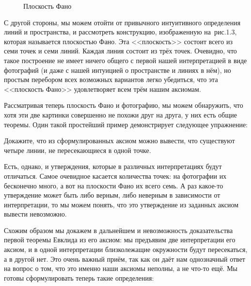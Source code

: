\begin{figure}[H]
\centering
{}
\caption{Плоскость Фано}
\end{figure}

С другой стороны, мы можем отойти от привычного интуитивного определения линий и пространства, и рассмотреть конструкцию, изображенную на~рис.1.3, которая называется плоскостью Фано. Эта <<плоскость>> состоит всего из семи точек и семи линий. Каждая линия состоит из трёх точек. Очевидно, что такое построение не имеет ничего общего с первой нашей интерпретацией в виде фотографий (и даже с нашей интуицией о пространстве и линиях в нём), но простым перебором всех возможных вариантов легко убедиться, что эта <<плоскость Фано>> удовлетворяет всем трём нашим аксиомам.

Рассматривая теперь плоскость Фано и фотографию, мы можем обнаружить, что хотя эти две картинки совершенно не похожи друг на друга, у них есть общие теоремы. Один такой простейший пример демонстрирует следующее упражнение:

\begin{exercise}
Докажите, что из сформулированных аксиом можно вывести, что существуют четыре линии, не пересекающиеся в одной точке.
\end{exercise}

Есть, однако, и утверждения, которые в различных интерпретациях будут отличаться. Самое очевидное касается количества точек: на фотографии их бесконечно много, а вот на плоскости Фано их всего семь. А раз какое-то утверждение может быть либо верным, либо неверным в зависимости от интерпретации, то мы можем понять, что это утверждение из заданных аксиом вывести невозможно.

Схожим образом мы докажем в дальнейшем и невозможность доказательства первой теоремы Евклида из его аксиом: мы предъявим две интерпретации его аксиом, и в одной интерпретации близколежащие окружности будут пересекаться, а в другой нет. Это очень важный приём, так как он даёт нам однозначный ответ на вопрос о том, что это именно наши аксиомы неполны, а не что-то ещё. Мы готовы сформулировать теперь такие определения:

